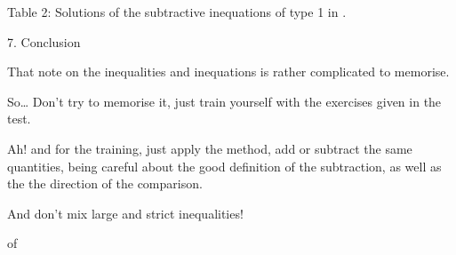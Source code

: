 \documentclass{article}
\begin{document}
Table 2: Solutions of the subtractive inequations of type 1 in .





7. Conclusion

That note on the inequalities and inequations is rather complicated to memorise.

So… Don’t try to memorise it, just train yourself with the exercises given in the test.

Ah! and for the training, just apply the method, add or subtract the same quantities, being careful about the good definition of the subtraction, as well as the the direction of the comparison.

And don’t mix large and strict inequalities!



 of
\end{document}
